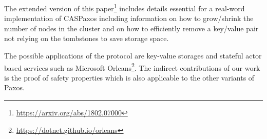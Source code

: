\documentclass[a4paper,USenglish]{lipics-v2018}
\theoremstyle{definition}
\begin{document}
The extended version of this paper\footnote{\href{https://arxiv.org/abs/1802.07000}{https://arxiv.org/abs/1802.07000}} includes details essential for a real-word implementation of CASPaxos including information on how to grow/shrink the number of nodes in the cluster and on how to efficiently remove a key/value pair not relying on the tombstones to save storage space.

The possible applications of the protocol are key-value storages and stateful actor based services such as Microsoft Orleans\footnote{\href{https://dotnet.github.io/orleans}{https://dotnet.github.io/orleans}}. The indirect contributions of our work is the proof of safety properties which is also applicable to the other variants of Paxos.


\end{document}
